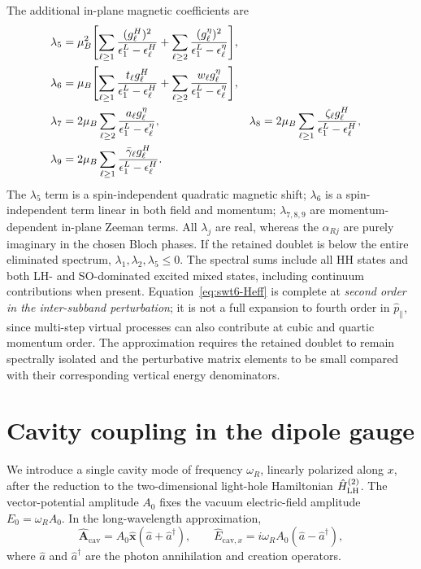The additional in-plane magnetic coefficients are
\begin{align}
 \lambda_5={}&\mu_B^2\Biggl[
 \sum_{\ell\ge1}\frac{(g_\ell^H)^2}{\epsilon_ 1^L-\epsilon_ \ell^H}
 +\sum_{\ell\ge2}\frac{(g_\ell^\eta)^2}{\epsilon_ 1^L-\epsilon_ \ell^\eta}\Biggr],\\
 \lambda_6={}&\mu_B\Biggl[
 \sum_{\ell\ge1}\frac{t_\ell g_\ell^H}{\epsilon_ 1^L-\epsilon_ \ell^H}
 +\sum_{\ell\ge2}\frac{w_\ell g_\ell^\eta}{\epsilon_ 1^L-\epsilon_ \ell^\eta}\Biggr],\\
 \lambda_7={}&2\mu_B\sum_{\ell\ge2}
 \frac{a_\ell g_\ell^\eta}{\epsilon_ 1^L-\epsilon_ \ell^\eta},
 &\lambda_8={}&2\mu_B\sum_{\ell\ge1}
 \frac{\zeta_\ell g_\ell^H}{\epsilon_ 1^L-\epsilon_ \ell^H},\\
 \lambda_9={}&2\mu_B\sum_{\ell\ge1}
 \frac{\bar\gamma_\ell g_\ell^H}{\epsilon_ 1^L-\epsilon_ \ell^H}.
 \label{eq:swt6-magnetic-coeff}
\end{align}
The $\lambda_5$ term is a spin-independent quadratic magnetic shift;
$\lambda_6$ is a spin-independent term linear in both field and momentum;
$\lambda_{7,8,9}$ are momentum-dependent in-plane Zeeman terms.
All $\lambda_j$ are real, whereas the $\alpha_{Rj}$ are purely imaginary
in the chosen Bloch phases. If the retained doublet is below the entire
eliminated spectrum, $\lambda_1,\lambda_2,\lambda_5\le0$.
The spectral sums include all HH states and both LH- and SO-dominated
excited mixed states, including continuum contributions when present.
Equation~\eqref{eq:swt6-Heff} is complete at \emph{second order in the
inter-subband perturbation}; it is not a full expansion to fourth order
in $ \hat{p}_ \parallel$, since multi-step virtual processes can also contribute
at cubic and quartic momentum order. The approximation requires the
retained doublet to remain spectrally isolated and the perturbative
matrix elements to be small compared with their corresponding vertical
energy denominators.
















\section{Cavity coupling in the dipole gauge}
\label{sec:cavity}

We introduce a single cavity mode of frequency $\omega_R$,
linearly polarized along $x$, after the reduction to the
two-dimensional light-hole Hamiltonian $\hat H_{\mathrm{LH}}^{(2)}$.
The vector-potential amplitude $A_0$ fixes the vacuum
electric-field amplitude $E_0=\omega_R A_0$. In the
long-wavelength approximation,
\begin{equation}
\hat{\bm A}_{\mathrm{cav}}
=A_0\hat{\bm x}(\hat a+\hat a^\dagger),
\qquad
\hat E_{\mathrm{cav},x}
=i\omega_R A_0(\hat a-\hat a^\dagger),
\label{eq:cavity-field}
\end{equation}
where $\hat a$ and $\hat a^\dagger$ are the photon
annihilation and creation operators.

